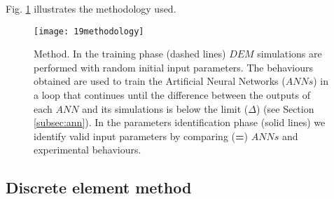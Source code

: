 \documentclass{CFD2015}
\begin{document}
Fig. \ref{fig:19methodology} illustrates the methodology used.

\begin{figure}%
\centering 
\texttt{[image: 19methodology]} 
\caption[Method]{Method. 
In the training phase (dashed lines)
$DEM$ simulations are performed
with random initial input parameters.
The behaviours obtained are used to train the
Artificial Neural Networks ($ANNs$) in a loop that continues until the
difference between the outputs of each $ANN$ and its simulations is below the
limit ($\Delta$) (see Section \ref{subsec:ann}).
In the parameters identification phase (solid
lines) we identify valid input parameters by comparing (\textbf{=}) $ANNs$ and
experimental behaviours.
}
\label{fig:19methodology} 
\end{figure}
\subsection{Discrete element method}
\label{subsec:dem}
\end{document}
